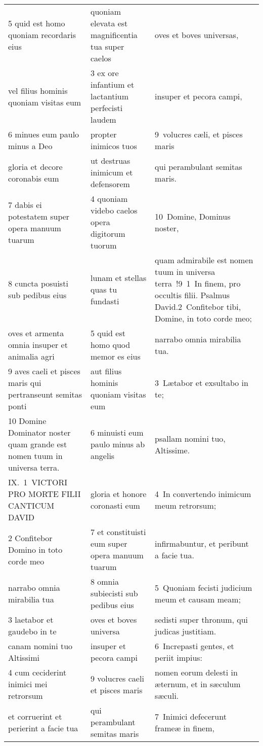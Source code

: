 \documentclass{article}
\begin{document}
\begin{longtable}{@{}p{}p{}p{}@{}}
5 quid est homo quoniam recordaris eius	&	quoniam elevata est magnificentia tua super caelos	&	oves et boves universas,	\\
vel filius hominis quoniam visitas eum	&	3 ex ore infantium et lactantium perfecisti laudem	&	insuper et pecora campi,	\\
6 minues eum paulo minus a Deo	&	propter inimicos tuos	&	9 volucres cæli, et pisces maris	\\
gloria et decore coronabis eum	&	ut destruas inimicum et defensorem	&	qui perambulant semitas maris.	\\
7 dabis ei potestatem super opera manuum tuarum	&	4 quoniam videbo caelos opera digitorum tuorum	&	10 Domine, Dominus noster,	\\
8 cuncta posuisti sub pedibus eius	&	lunam et stellas quas tu fundasti	&	quam admirabile est nomen tuum in universa terra !9 1 In finem, pro occultis filii. Psalmus David.2 Confitebor tibi, Domine, in toto corde meo;	\\
oves et armenta omnia insuper et animalia agri	&	5 quid est homo quod memor es eius	&	narrabo omnia mirabilia tua.	\\
9 aves caeli et pisces maris qui pertranseunt semitas ponti	&	aut filius hominis quoniam visitas eum	&	3 Lætabor et exsultabo in te;	\\
10 Domine Dominator noster quam grande est nomen tuum in universa terra.	&	6 minuisti eum paulo minus ab angelis	&	psallam nomini tuo, Altissime.	\\
IX. 1 VICTORI PRO MORTE FILII CANTICUM DAVID	&	gloria et honore coronasti eum	&	4 In convertendo inimicum meum retrorsum;	\\
2 Confitebor Domino in toto corde meo	&	7 et constituisti eum super opera manuum tuarum	&	infirmabuntur, et peribunt a facie tua.	\\
narrabo omnia mirabilia tua	&	8 omnia subiecisti sub pedibus eius	&	5 Quoniam fecisti judicium meum et causam meam;	\\
3 laetabor et gaudebo in te	&	oves et boves universa	&	sedisti super thronum, qui judicas justitiam.	\\
canam nomini tuo Altissimi	&	insuper et pecora campi	&	6 Increpasti gentes, et periit impius:	\\
4 cum ceciderint inimici mei retrorsum	&	9 volucres caeli et pisces maris	&	nomen eorum delesti in æternum, et in sæculum sæculi.	\\
et corruerint et perierint a facie tua	&	qui perambulant semitas maris	&	7 Inimici defecerunt frameæ in finem,	\\

\end{longtable}
\end{document}
